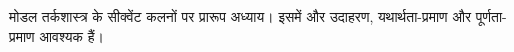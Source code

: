 \documentclass[../../../include/open-logic-chapter]{subfiles}
\begin{document}
\begin{editorial}
  मोडल तर्कशास्त्र के सीक्वेंट कलनों पर प्रारूप अध्याय। इसमें और उदाहरण,
  यथार्थता-प्रमाण और पूर्णता-प्रमाण आवश्यक हैं।
\end{editorial}


\OLEndChapterHook
\end{document}
